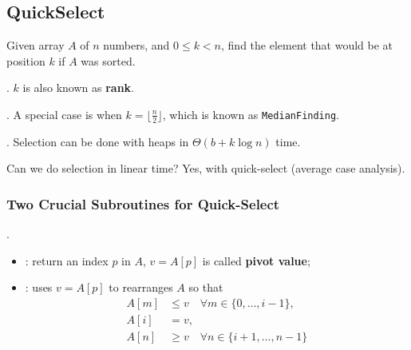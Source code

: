 \documentclass{article}
\begin{document}
\begin{center}
\end{center}

\subsection{QuickSelect}

Given array $A$ of $n$ numbers, and $0 \leq k < n$, find the element that would be at position $k$ if $A$ was sorted. 

\begin{deff}.
    $k$ is also known as \textbf{rank}. 
\end{deff}

\begin{comm}[].
    A special case is when $\displaystyle k = \lfloor \frac{n}{2} \rfloor$, which is known as \texttt{MedianFinding}. 
\end{comm}

\begin{thmm}[].
    Selection can be done with heaps in $\Theta (b + k \log{n})$ time. 
\end{thmm}

\begin{Question}{Can we do selection in linear time?}
    Yes, with quick-select (average case analysis). 
\end{Question}

\subsubsection{Two Crucial Subroutines for Quick-Select}

\begin{codes}[].
    \begin{itemize}
        \item {}: return an index $p$ in $A$, $v = A[p]$ is called \textbf{pivot value}; 
        \item {}: uses $v = A[p]$ to rearranges $A$ so that \begin{align*}
            A[m] & \leq v \quad \forall m \in \{0, \ldots, i-1\}, \\ 
            A[i] & = v, \\ 
            A[n] & \geq v \quad \forall n \in \{i+1, \ldots, n-1\} \\ 
        \end{align*}
    \end{itemize}
\end{codes}
\end{document}
